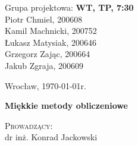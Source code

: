\noindent
\begin{minipage}[t]{.5\linewidth}
	\begin{flushleft}
		Grupa projektowa: \textbf{WT, TP, 7:30}\\
		\vspace{0.8cm}
		Piotr Chmiel, 200608\\
		Kamil Machnicki, 200752\\
		Łukasz Matysiak, 200646\\
		Grzegorz Zając, 200664\\
		Jakub Zgraja, 200609\\
	\end{flushleft} 
\end{minipage}%
\begin{minipage}[t]{.5\linewidth}
	\begin{flushright}
		Wrocław, \today r.\\
		\vspace{.35cm}

	\end{flushright}
\end{minipage}

\vspace{3.0cm}

\begin{center}
	{\Huge\bf Miękkie metody obliczeniowe}\\
		
\end{center}


\vspace{2cm}
\begin{center}
		\textsc{Prowadzący:}\\
		dr inż. Konrad Jackowski
\end{center}
